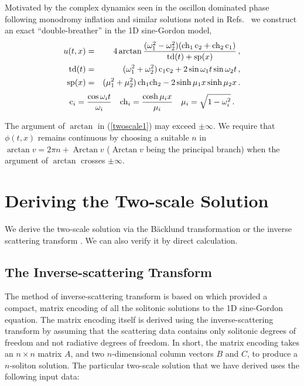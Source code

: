 \documentclass[%
reprint,
superscriptaddress,
amsmath,amssymb,
aps,
prd,
floatfix,
nofootinbib
]{revtex4-1}
\def\ch{{\rm ch}}
\def\cs{{\rm c}}
\def\td{{\rm td}}
\def\sp{{\rm sp}}
\DeclareMathOperator{\Arctan}{Arctan}
\begin{document}
Motivated by the complex dynamics seen in the oscillon dominated phase \cite{Amin:2011hj} following monodromy inflation \cite{Silverstein:2008sg,McAllister:2008hb,Flauger:2009ab} and similar solutions noted in Refs.~\cite{Hindmarsh:2006ur,Amin:2010xe,Salmi:2012ta} we  construct an exact  ``double-breather'' in the 1D sine-Gordon model, 
%
 \begin{eqnarray}\label{twoscale1}
  u(t,x)&=&4 \arctan \frac{(\omega_1^2-\omega_2^2)(\ch_1\,\cs_2+\ch_2\,\cs_1)}{\td(t)+\sp(x)} \, , \\
    \td(t) &=& (\omega_1^2+\omega_2^2)\,\cs_1\cs_2 +2 \sin \omega_1 t \sin \omega_2 t \, , \\
  \sp(x) &=& (\mu_1^2+\mu_2^2)\,\ch_1\ch_2 - 2  \sinh \mu_1 x \sinh \mu_2 x  \, .
\end{eqnarray}
%
\begin{equation}\label{twoscale2}
    \cs_i = \frac{\cos \omega_i t}{\omega_i} \quad \ch_i = \frac{\cosh \mu_i x}{\mu_i}  \quad   \mu_i=\sqrt{1-\omega_i^2} \, .
\end{equation}    

The argument of $\arctan$ in (\ref{twoscale1}) may exceed $\pm\infty$. We require that $\phi(t,x)$ remains continuous by choosing a suitable $n$ in $\arctan v = 2\pi n+ \Arctan v$ ($\Arctan v$ being the principal branch) when the argument of $\arctan$ crosses $\pm\infty$.

\section{Deriving the Two-scale Solution}
We derive the two-scale solution via the B\"acklund transformation  \cite{Dodd499, hietarinta1997introduction, Cuenda20111047} or the  inverse scattering transform \cite{ablowitz, :/content/aip/journal/jmp/51/12/10.1063/1.3520596}. We can also verify it by direct calculation.

\subsection{The Inverse-scattering Transform}
The method of inverse-scattering transform is based on \cite{:/content/aip/journal/jmp/51/12/10.1063/1.3520596} which provided a compact, matrix encoding of all the solitonic solutions to the 1D sine-Gordon equation. The matrix encoding itself is derived using the inverse-scattering transform by assuming that the scattering data contains only solitonic degrees of freedom and not radiative degrees of freedom. In short, the matrix encoding takes an $n\times n$ matrix $A$, and two $n$-dimensional column vectors $B$ and $C$, to produce a $n$-soliton solution. The particular two-scale solution that we have derived uses the following input data:
\end{document}
